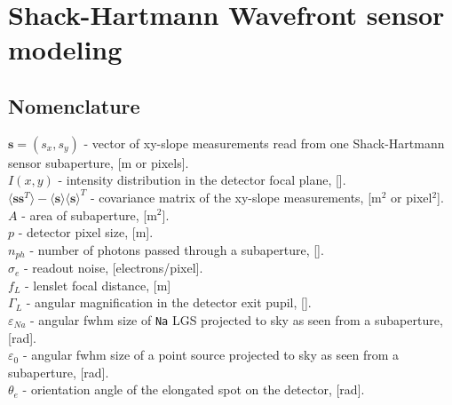 
\newpage
\section{Shack-Hartmann Wavefront sensor modeling}
\label{sec:sh-wfs}

\mbox{}

\subsection{Nomenclature}

\mbox{}

$\bm{s} = (s_{x},s_{y})$ - vector of xy-slope measurements read from one
Shack-Hartmann sensor subaperture, [m or pixels].
\\

$I(x,y)$ - intensity distribution in the detector focal plane, [].
\\

$\langle \bm{s} \bm{s}^{T} \rangle - \langle \bm{s} \rangle
\langle \bm{s} \rangle^{T}$ - covariance matrix of the xy-slope measurements,
[m$^{2}$ or pixel$^{2}$].
\\

$A$ - area of subaperture, [m$^{2}$].
\\

$p$ - detector pixel size, [m].
\\

$n_{ph}$ - number of photons passed through a subaperture, [].
\\

$\sigma_{e}$ - readout noise, [electrons/pixel].
\\

$f_{L}$ - lenslet focal distance, [m]
\\

$\Gamma_{L}$ - angular magnification in the detector exit pupil, [].
\\

$\varepsilon_{Na}$ - angular fwhm size of \texttt{Na} LGS projected to sky as
seen from a subaperture, [rad].
\\

$\varepsilon_{0}$ - angular fwhm size of a point source projected to sky as
seen from a subaperture, [rad].
\\

$\theta_{e}$ - orientation angle of the elongated spot on the detector, [rad].


